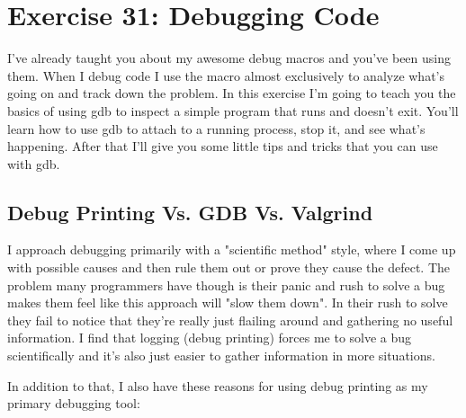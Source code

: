 \chapter{Exercise 31: Debugging Code}

I've already taught you about my awesome debug macros and you've been using
them.  When I debug code I use the  macro almost exclusively to
analyze what's going on and track down the problem.  In this exercise I'm going
to teach you the basics of using gdb to inspect a simple program that runs and
doesn't exit.  You'll learn how to use gdb to attach to a running process, stop
it, and see what's happening.  After that I'll give you some little tips and
tricks that you can use with gdb.


\section{Debug Printing Vs. GDB Vs. Valgrind}

I approach debugging primarily with a "scientific method" style, where I come
up with possible causes and then rule them out or prove they cause the defect.
The problem many programmers have though is their panic and rush to solve a bug
makes them feel like this approach will "slow them down".  In their rush to
solve they fail to notice that they're really just flailing around and
gathering no useful information.  I find that logging (debug printing) forces
me to solve a bug scientifically and it's also just easier to gather
information in more situations.

In addition to that, I also have these reasons for using debug printing as my
primary debugging tool:

